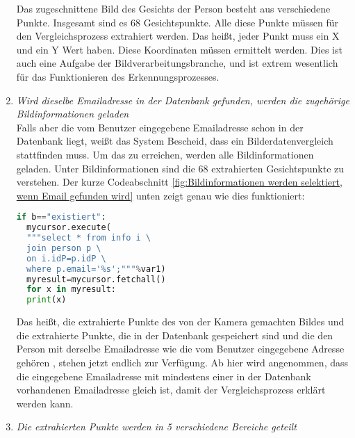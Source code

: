 \begin{enumerate}
Das zugeschnittene Bild des Gesichts der Person besteht aus verschiedene Punkte. Insgesamt sind es 68 Gesichtspunkte. Alle diese Punkte müssen für den Vergleichsprozess extrahiert werden. Das heißt, jeder Punkt muss ein X und ein Y Wert haben. Diese Koordinaten müssen ermittelt werden. Dies ist auch eine Aufgabe der Bildverarbeitungsbranche, und ist extrem wesentlich für das Funktionieren des Erkennungsprozesses.
	\item \textit{Wird dieselbe Emailadresse in der Datenbank gefunden, werden die zugehörige Bildinformationen geladen} \\
	
	Falls aber die vom Benutzer eingegebene Emailadresse schon in der Datenbank liegt, weißt das System Bescheid, dass ein Bilderdatenvergleich stattfinden muss. Um das zu erreichen, werden alle Bildinformationen geladen. Unter Bildinformationen sind die 68 extrahierten Gesichtspunkte zu verstehen. Der kurze Codeabschnitt \ref{fig:Bildinformationen werden selektiert, wenn Email gefunden wird} unten zeigt genau wie dies funktioniert: \\
	
  \begin{lstlisting}[caption={Bildinformationen werden selektiert, wenn Email gefunden wird}, label={fig:Bildinformationen werden selektiert, wenn Email gefunden wird}, language=Python]
  if b=="existiert":
  mycursor.execute(
  """select * from info i \
  join person p \
  on i.idP=p.idP \
  where p.email='%s';"""%var1)
  myresult=mycursor.fetchall()
  for x in myresult:
  print(x)
  \end{lstlisting}
	
	Das heißt, die extrahierte Punkte des von der Kamera gemachten Bildes und die extrahierte Punkte, die in der Datenbank gespeichert sind und die den Person mit derselbe Emailadresse wie die vom Benutzer eingegebene Adresse gehören , stehen jetzt endlich zur Verfügung. Ab hier wird angenommen, dass die eingegebene Emailadresse mit mindestens einer in der Datenbank vorhandenen Emailadresse gleich ist, damit der Vergleichsprozess erklärt werden kann.
	\item \textit{Die extrahierten Punkte werden in 5 verschiedene Bereiche geteilt} \\
	

\end{enumerate}

